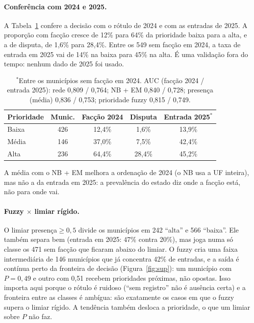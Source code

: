 \documentclass[10pt,a4paper,twocolumn]{article}
\begin{document}
\paragraph{Conferência com 2024 e 2025.} A Tabela~\ref{tab:fuzzy} confere a decisão com o
rótulo de 2024 e com as entradas de 2025. A proporção com facção cresce de 12\% para 64\% da
prioridade baixa para a alta, e a de disputa, de 1,6\% para 28,4\%. Entre os 549 sem facção
em 2024, a taxa de entrada em 2025 vai de 14\% na baixa para 45\% na alta. É uma validação
fora do tempo: nenhum dado de 2025 foi usado.

\begin{table}[t]
\centering\small
\begin{tabular}{@{}lcccc@{}}
\toprule
Prioridade & Munic. & Facção 2024 & Disputa & Entrada 2025$^*$\\
\midrule
Baixa & 426 & 12,4\% & 1,6\% & 13,9\%\\
Média & 146 & 37,0\% & 7,5\% & 42,4\%\\
Alta & 236 & 64,4\% & 28,4\% & 45,2\%\\
\bottomrule
\end{tabular}
\caption{$^*$Entre os municípios sem facção em 2024. AUC (facção 2024 / entrada 2025): rede
0,809 / 0,764; NB + EM 0,840 / 0,728; presença (média) 0,836 / 0,753; prioridade fuzzy
0,815 / 0,749.}\label{tab:fuzzy}
\end{table}

A média com o NB + EM melhora a ordenação de 2024 (o NB usa a UF inteira), mas não a da
entrada em 2025: a prevalência do estado diz onde a facção está, não para onde vai.

\paragraph{Fuzzy $\times$ limiar rígido.} O limiar presença${}\ge0{,}5$ divide os municípios
em 242 ``alta'' e 566 ``baixa''. Ele também separa bem (entrada em 2025: 47\% contra 20\%),
mas joga numa só classe os 471 sem facção que ficaram abaixo do limiar. O fuzzy cria uma
faixa intermediária de 146 municípios que já concentra 42\% de entradas, e a saída é contínua
perto da fronteira de decisão (Figura~\ref{fig:sup}): um município com $P=0{,}49$ e outro
com 0,51 recebem prioridades próximas, não opostas. Isso importa aqui porque o rótulo é
ruidoso (``sem registro'' não é ausência certa) e a fronteira entre as classes é ambígua:
são exatamente os casos em que o fuzzy supera o limiar rígido. A tendência também desloca a
prioridade, o que um limiar sobre $P$ não faz.
\end{document}
